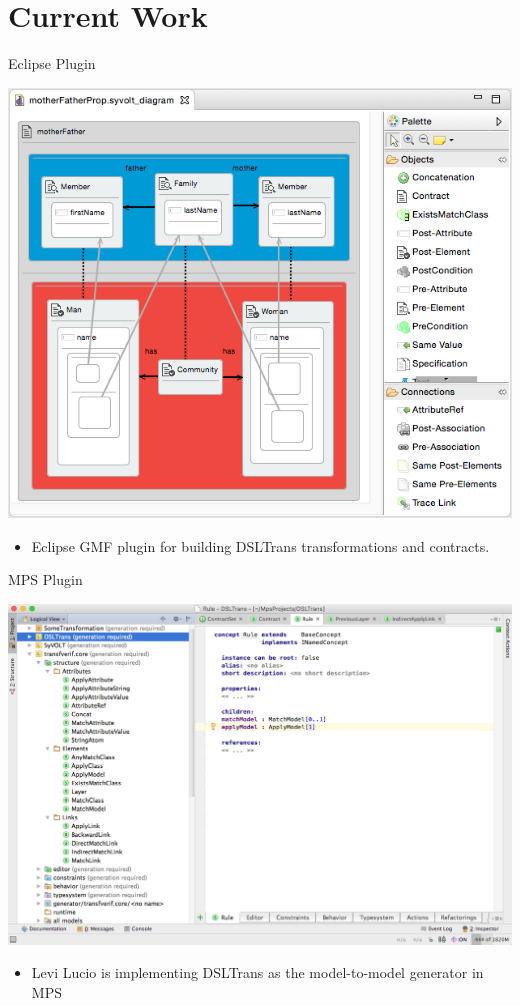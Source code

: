 \documentclass[12pt, handout]{beamer}
\begin{document}
\section{Current Work}




\begin{frame}{Eclipse Plugin}
\begin{center}
\includegraphics[height=0.8\textheight]{figures/eclipse_frontend}
\end{center}

\begin{itemize}
\item Eclipse GMF plugin for building DSLTrans transformations and contracts.
\end{itemize}
\end{frame}

\begin{frame}{MPS Plugin}
\begin{center}
\includegraphics[height=0.8\textheight]{figures/DSLTransMPS}
\end{center}

\begin{itemize}
\item Levi Lucio is implementing DSLTrans as the model-to-model generator in MPS
\end{itemize}
\end{frame}
\end{document}
